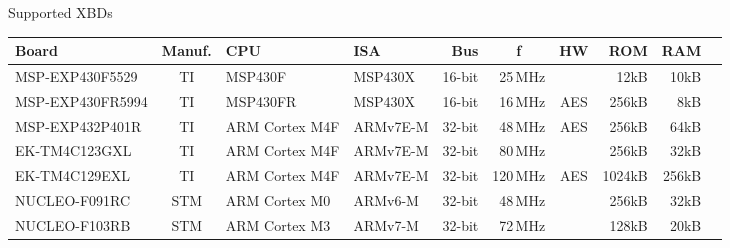 \documentclass[xcolor=pdftex,dvipsnames,table,final]{beamer}
\newcommand{\thb}[1]{\multicolumn{1}{c}{\textbf{#1}}}
\begin{document}
\begin{frame}[fragile]{}
\begin{columns}[t, totalwidth=\textwidth]
\begin{column}{.675\linewidth}
   \begin{columns}%
   \begin{column}{0.977\linewidth}
      \begin{block}{Supported XBDs}\centering
          \renewcommand\tabcolsep{4pt}%
    \begin{tabular}{l|c|ll|rrc|rr|r}
    \textbf{Board}   & \textbf{Manuf.}&\textbf{CPU}&\textbf{ISA}&\textbf{Bus}&\thb{f}&\textbf{HW}&\textbf{ROM}&\textbf{RAM} \\ \hline
    MSP-EXP430F5529  & TI        & MSP430F        &  MSP430X    & 16-bit &  25\,MHz &     &   12kB &  10kB  \\
    MSP-EXP430FR5994 & TI        & MSP430FR       &  MSP430X    & 16-bit &  16\,MHz & AES &  256kB &   8kB  \\
    MSP-EXP432P401R  & TI        & ARM Cortex M4F &  ARMv7E-M   & 32-bit &  48\,MHz & AES &  256kB &  64kB  \\
    EK-TM4C123GXL    & TI        & ARM Cortex M4F &  ARMv7E-M   & 32-bit &  80\,MHz &     &  256kB &  32kB  \\ 
    EK-TM4C129EXL    & TI        & ARM Cortex M4F &  ARMv7E-M   & 32-bit & 120\,MHz & AES & 1024kB & 256kB  \\ 
    NUCLEO-F091RC    & STM       & ARM Cortex M0  &  ARMv6-M    & 32-bit &  48\,MHz &     &  256kB &  32kB  \\
    NUCLEO-F103RB    & STM       & ARM Cortex M3  &  ARMv7-M    & 32-bit &  72\,MHz &     &  128kB &  20kB  \\
    \end{tabular}
       \end{block}
\end{column}
\end{columns}
     
\end{column}
\end{columns}

\end{frame}
\end{document}
